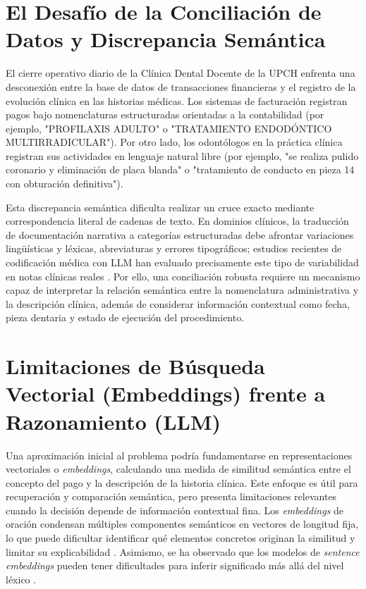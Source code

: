 \section{El Desafío de la Conciliación de Datos y Discrepancia Semántica}

El cierre operativo diario de la Clínica Dental Docente de la UPCH enfrenta una desconexión entre la base de datos de transacciones financieras y el registro de la evolución clínica en las historias médicas. Los sistemas de facturación registran pagos bajo nomenclaturas estructuradas orientadas a la contabilidad (por ejemplo, "PROFILAXIS ADULTO" o "TRATAMIENTO ENDODÓNTICO MULTIRRADICULAR"). Por otro lado, los odontólogos en la práctica clínica registran sus actividades en lenguaje natural libre (por ejemplo, "se realiza pulido coronario y eliminación de placa blanda" o "tratamiento de conducto en pieza 14 con obturación definitiva").

Esta discrepancia semántica dificulta realizar un cruce exacto mediante correspondencia literal de cadenas de texto. En dominios clínicos, la traducción de documentación narrativa a categorías estructuradas debe afrontar variaciones lingüísticas y léxicas, abreviaturas y errores tipográficos; estudios recientes de codificación médica con LLM han evaluado precisamente este tipo de variabilidad en notas clínicas reales \cite{hou2025coding}. Por ello, una conciliación robusta requiere un mecanismo capaz de interpretar la relación semántica entre la nomenclatura administrativa y la descripción clínica, además de considerar información contextual como fecha, pieza dentaria y estado de ejecución del procedimiento.

\section{Limitaciones de Búsqueda Vectorial (Embeddings) frente a Razonamiento (LLM)}

Una aproximación inicial al problema podría fundamentarse en representaciones vectoriales o \textit{embeddings}, calculando una medida de similitud semántica entre el concepto del pago y la descripción de la historia clínica. Este enfoque es útil para recuperación y comparación semántica, pero presenta limitaciones relevantes cuando la decisión depende de información contextual fina. Los \textit{embeddings} de oración condensan múltiples componentes semánticos en vectores de longitud fija, lo que puede dificultar identificar qué elementos concretos originan la similitud y limitar su explicabilidad \cite{wang2023token}. Asimismo, se ha observado que los modelos de \textit{sentence embeddings} pueden tener dificultades para inferir significado más allá del nivel léxico \cite{zhang2024semantic}.

